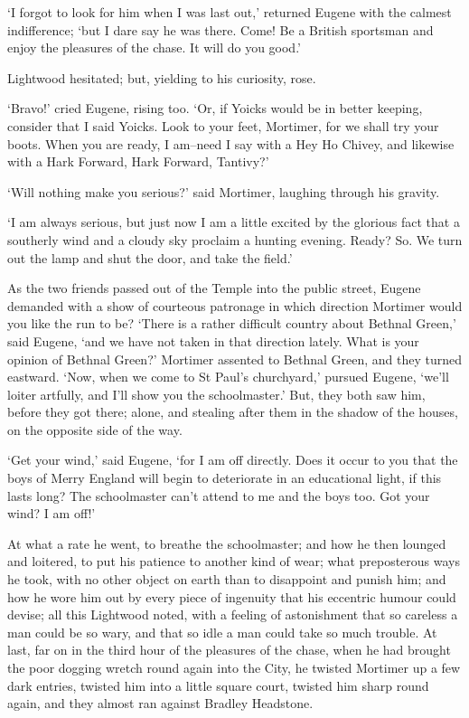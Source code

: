 ‘I forgot to look for him when I was last out,’ returned Eugene with the
calmest indifference; ‘but I dare say he was there. Come! Be a British
sportsman and enjoy the pleasures of the chase. It will do you good.’

Lightwood hesitated; but, yielding to his curiosity, rose.

‘Bravo!’ cried Eugene, rising too. ‘Or, if Yoicks would be in better
keeping, consider that I said Yoicks. Look to your feet, Mortimer, for
we shall try your boots. When you are ready, I am--need I say with a Hey
Ho Chivey, and likewise with a Hark Forward, Hark Forward, Tantivy?’

‘Will nothing make you serious?’ said Mortimer, laughing through his
gravity.

‘I am always serious, but just now I am a little excited by the glorious
fact that a southerly wind and a cloudy sky proclaim a hunting evening.
Ready? So. We turn out the lamp and shut the door, and take the field.’

As the two friends passed out of the Temple into the public street,
Eugene demanded with a show of courteous patronage in which direction
Mortimer would you like the run to be? ‘There is a rather difficult
country about Bethnal Green,’ said Eugene, ‘and we have not taken in
that direction lately. What is your opinion of Bethnal Green?’ Mortimer
assented to Bethnal Green, and they turned eastward. ‘Now, when we come
to St Paul’s churchyard,’ pursued Eugene, ‘we’ll loiter artfully, and
I’ll show you the schoolmaster.’ But, they both saw him, before they got
there; alone, and stealing after them in the shadow of the houses, on
the opposite side of the way.

‘Get your wind,’ said Eugene, ‘for I am off directly. Does it occur
to you that the boys of Merry England will begin to deteriorate in an
educational light, if this lasts long? The schoolmaster can’t attend to
me and the boys too. Got your wind? I am off!’

At what a rate he went, to breathe the schoolmaster; and how he then
lounged and loitered, to put his patience to another kind of wear;
what preposterous ways he took, with no other object on earth than to
disappoint and punish him; and how he wore him out by every piece of
ingenuity that his eccentric humour could devise; all this Lightwood
noted, with a feeling of astonishment that so careless a man could be so
wary, and that so idle a man could take so much trouble. At last, far on
in the third hour of the pleasures of the chase, when he had brought the
poor dogging wretch round again into the City, he twisted Mortimer up
a few dark entries, twisted him into a little square court, twisted him
sharp round again, and they almost ran against Bradley Headstone.

